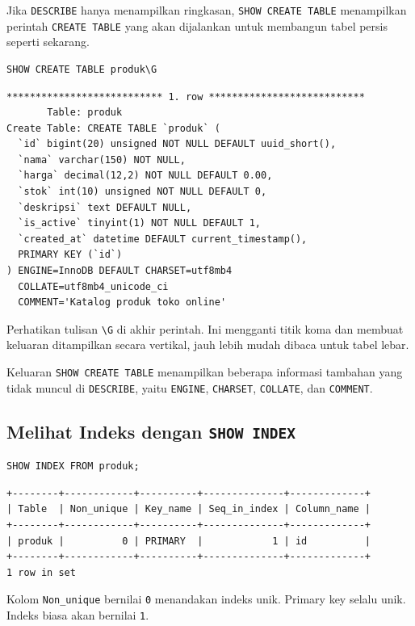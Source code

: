 \documentclass[11pt,a4paper]{article}
\begin{document}
Jika \texttt{DESCRIBE} hanya menampilkan ringkasan, \texttt{SHOW CREATE TABLE} menampilkan perintah \texttt{CREATE TABLE} yang akan dijalankan untuk membangun tabel persis seperti sekarang.

\begin{lstlisting}[style=code]
SHOW CREATE TABLE produk\G
\end{lstlisting}

\begin{lstlisting}[style=out]
*************************** 1. row ***************************
       Table: produk
Create Table: CREATE TABLE `produk` (
  `id` bigint(20) unsigned NOT NULL DEFAULT uuid_short(),
  `nama` varchar(150) NOT NULL,
  `harga` decimal(12,2) NOT NULL DEFAULT 0.00,
  `stok` int(10) unsigned NOT NULL DEFAULT 0,
  `deskripsi` text DEFAULT NULL,
  `is_active` tinyint(1) NOT NULL DEFAULT 1,
  `created_at` datetime DEFAULT current_timestamp(),
  PRIMARY KEY (`id`)
) ENGINE=InnoDB DEFAULT CHARSET=utf8mb4
  COLLATE=utf8mb4_unicode_ci
  COMMENT='Katalog produk toko online'
\end{lstlisting}

Perhatikan tulisan \texttt{\textbackslash G} di akhir perintah. Ini mengganti titik koma dan membuat keluaran ditampilkan secara vertikal, jauh lebih mudah dibaca untuk tabel lebar.

Keluaran \texttt{SHOW CREATE TABLE} menampilkan beberapa informasi tambahan yang tidak muncul di \texttt{DESCRIBE}, yaitu \texttt{ENGINE}, \texttt{CHARSET}, \texttt{COLLATE}, dan \texttt{COMMENT}.

\subsection{Melihat Indeks dengan \texttt{SHOW INDEX}}

\begin{lstlisting}[style=code]
SHOW INDEX FROM produk;
\end{lstlisting}

\begin{lstlisting}[style=out]
+--------+------------+----------+--------------+-------------+
| Table  | Non_unique | Key_name | Seq_in_index | Column_name |
+--------+------------+----------+--------------+-------------+
| produk |          0 | PRIMARY  |            1 | id          |
+--------+------------+----------+--------------+-------------+
1 row in set
\end{lstlisting}

Kolom \texttt{Non\_unique} bernilai \texttt{0} menandakan indeks unik. Primary key selalu unik. Indeks biasa akan bernilai \texttt{1}.
\end{document}
